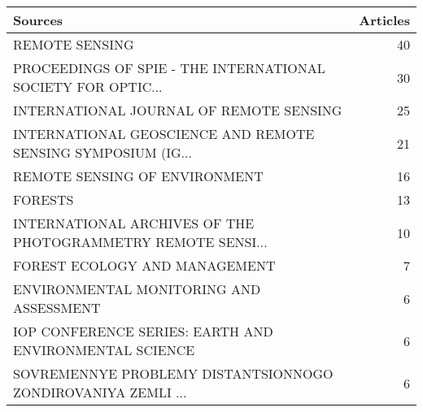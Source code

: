 
\begin{tabular}{lr}
\toprule
Sources & Articles\\
\midrule
REMOTE SENSING & 40\\
PROCEEDINGS OF SPIE - THE INTERNATIONAL SOCIETY FOR OPTIC... & 30\\
INTERNATIONAL JOURNAL OF REMOTE SENSING & 25\\
INTERNATIONAL GEOSCIENCE AND REMOTE SENSING SYMPOSIUM (IG... & 21\\
REMOTE SENSING OF ENVIRONMENT & 16\\
\addlinespace
FORESTS & 13\\
INTERNATIONAL ARCHIVES OF THE PHOTOGRAMMETRY REMOTE SENSI... & 10\\
FOREST ECOLOGY AND MANAGEMENT & 7\\
ENVIRONMENTAL MONITORING AND ASSESSMENT & 6\\
IOP CONFERENCE SERIES: EARTH AND ENVIRONMENTAL SCIENCE & 6\\
\addlinespace
SOVREMENNYE PROBLEMY DISTANTSIONNOGO ZONDIROVANIYA ZEMLI ... & 6\\
\bottomrule
\end{tabular}